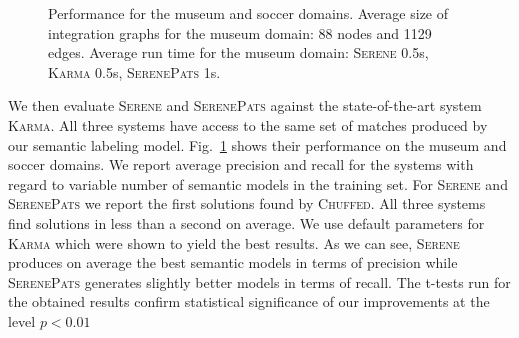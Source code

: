 \documentclass[letterpaper]{article} %
\newcommand{\chuffed}{\textsc{Chuffed}}
\newcommand{\karma}{\textsc{Karma}}
\newcommand{\serene}{\textsc{Serene}}
\newcommand{\serenepats}{\textsc{SerenePats}}
\newcommand{\forijcai}[1]{}
\begin{document}
\begin{figure}[!b]
\begin{minipage}[b]{0.5\linewidth}
\label{fig:soccerrec}
\end{minipage}%
\vspace*{-3mm}
\caption{Performance for the museum and soccer domains. 
Average size of integration graphs for the museum domain: 88 nodes and 1129 
edges.
Average run time for the museum domain: \serene{} 0.5s, \karma{} 0.5s, \serenepats{} 1s. \label{fig:perf}}
\vspace{-3mm}
\end{figure}


We then evaluate \serene{} and \serenepats{} against the state-of-the-art system \karma{}.
All three systems have access to the same set of matches produced by our semantic labeling model.
Fig.~\ref{fig:perf} shows their performance on the museum and soccer domains.
We report average precision and recall for the systems with regard to variable 
number of semantic models in the training set.
For \serene{} and \serenepats{} we report the first solutions found by
\chuffed{}. All three systems find solutions in less than a second on average.
We use default parameters for \karma{} which were shown to yield the best 
results\forijcai{~\cite{taheriyan2016learning}}.
As we can see, \serene{} produces on average the best semantic models in terms 
of precision while \serenepats{} generates slightly better models in terms of 
recall.
The t-tests run for the obtained results confirm statistical significance of our improvements at the level $p<0.01$
\end{document}
